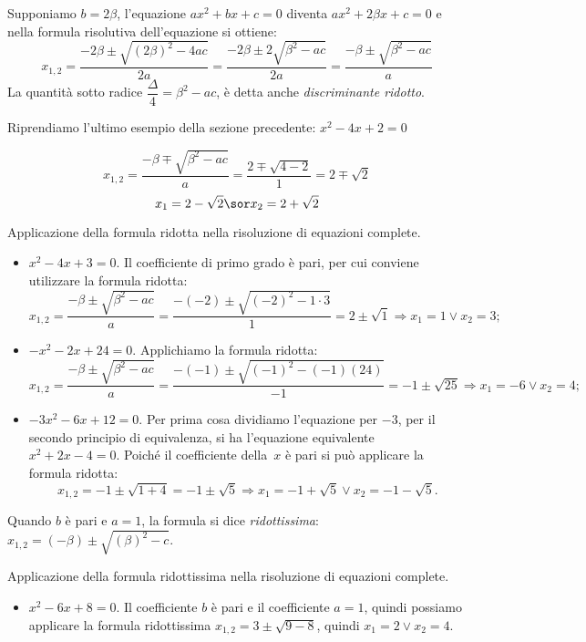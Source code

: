 Supponiamo \(b=2 \beta\), l'equazione \(a x^{2} + b x + c=0\) diventa 
\(a x^{2} + 2 \beta x + c=0\) 
e nella formula risolutiva dell'equazione si ottiene:
\[x_{1,2}=\frac{- 2 \beta \pm \sqrt{( 2 \beta )^{2}-4 a c}}{2 a}=
\frac{- 2 \beta \pm 2 \sqrt{\beta^{2} - a c}}{2 a}=
\frac{- \beta \pm \sqrt{\beta^{2} - a c}}{a}\]
La quantità sotto radice 
\(\dfrac{\Delta}{4} = \beta^{2} - a c\), 
è detta anche \emph{discriminante ridotto}.

\begin{esempio}
Riprendiamo l'ultimo esempio della sezione precedente: 
\(x^{2} - 4 x + 2=0\)

\[x_{1,2} = \frac{- \beta \mp \sqrt{\beta^2-ac}}{a} = 
\frac{2 \mp \sqrt{4-2}}{1} = 2 \mp \sqrt{2}\]
\[x_{1} = 2 - \sqrt{2} \sor x_{2} = 2 + \sqrt{2}\]
\end{esempio}
\begin{esempio}
 Applicazione della formula ridotta nella risoluzione di equazioni complete.
\begin{itemize}
\item \(x^{2} - 4 x + 3=0\). Il coefficiente di primo grado è pari, per cui 
conviene utilizzare la formula ridotta: 
\[x_{1,2} = \frac{- \beta \pm \sqrt{\beta^{2} - a c}}{a} =
\frac{-(-2 ) \pm \sqrt{(-2)^{2}-1 \cdot 3}}{1}=2 \pm 
\sqrt{1}\Rightarrow  x_{1} 
= 
1 \vee x_{2} = 3;\]
\item \(- x^{2} - 2 x + 24=0\). Applichiamo la formula ridotta: 
\[x_{1,2} = \frac{- \beta \pm \sqrt{\beta^{2} - a c}}{a} =
\frac{- ( - 1 ) \pm \sqrt{( -1 )^{2} - ( - 1 ) ( 24 )}}{- 1}=- 1 \pm 
\sqrt{25}\Rightarrow x_{1} = - 6 \vee x_{2} = 4;\]
\item \(- 3 x^{2} - 6 x + 12=0\). Per prima cosa dividiamo l'equazione per \(- 3\), 
per il secondo principio di equivalenza, si ha l'equazione equivalente~\(x^{2} + 
2 x - 4=0\). Poiché il coefficiente della~\(x\) è pari si può applicare la formula 
ridotta: 
\[x_{1,2}=- 1 \pm \sqrt{1 + 4} = - 1\pm \sqrt{5}\Rightarrow x_{1} = - 1 + 
\sqrt{5} \vee x_{2} = - 1 - \sqrt{5}.\]
\end{itemize}
\end{esempio}

Quando \(b\) è pari e \(a = 1\), la formula si dice \emph{ridottissima}: 
\(x_{1,2}=\left( - \beta \right) \pm \sqrt{\left( \beta \right)^{2} - c}\).

\begin{esempio}
 Applicazione della formula ridottissima nella risoluzione di equazioni 
complete.
\begin{itemize}
\item \(x^{2} - 6 x + 8 = 0\). Il coefficiente \(b\) è pari e il coefficiente 
\(a=1\), 
quindi possiamo applicare la formula ridottissima \(x_{1,2} = 3 \pm \sqrt{9 - 
8}\), quindi \(x_{1}=2 \vee x_{2} = 4\).
\end{itemize}
\end{esempio}


